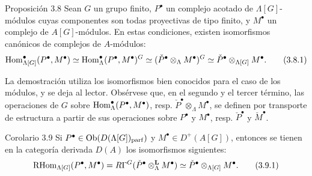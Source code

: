 \begin{statement}{Proposición 3.8}
Sean $G$ un grupo finito, $P^\bullet$ un complejo acotado de $\Lambda[G]$-módulos cuyas componentes son todas proyectivas de tipo finito, y $M^\bullet$ un complejo de $A[G]$-módulos. En estas condiciones, existen isomorfismos canónicos de complejos de $A$-módulos:
\[
\operatorname{Hom}_{\Lambda[G]}^\bullet(P^\bullet,M^\bullet)
\simeq \operatorname{Hom}_\Lambda^\bullet(P^\bullet,M^\bullet)^G
\simeq (\check P^\bullet\otimes_\Lambda M^\bullet)^G
\simeq \check P^\bullet\otimes_{\Lambda[G]}M^\bullet.
\tag{3.8.1}
\]
\end{statement}

La demostración utiliza los isomorfismos bien conocidos para el caso de los módulos, y se deja al lector. Obsérvese que, en el segundo y el tercer término, las operaciones de $G$ sobre $\operatorname{Hom}_\Lambda^\bullet(P^\bullet,M^\bullet)$, resp. $\check P^\bullet\otimes_\Lambda M^\bullet$, se definen por transporte de estructura a partir de sus operaciones sobre $P^\bullet$ y $M^\bullet$, resp. $\check P^\bullet$ y $\check M^\bullet$.

\begin{statement}{Corolario 3.9}
Si $P^\bullet\in \operatorname{Ob}(D(\Lambda[G])_{\mathrm{parf}})$ y $M^\bullet\in D^+(A[G])$, entonces se tienen en la categoría derivada $D(A)$ los isomorfismos siguientes:
\[
\mathrm{RHom}_{\Lambda[G]}(P^\bullet,M^\bullet)
=R\Gamma^G(\check P^\bullet\otimes_\Lambda^{\mathbf L}M^\bullet)
\simeq \check P^\bullet\otimes_{\Lambda[G]}M^\bullet.
\tag{3.9.1}
\]
\end{statement}
